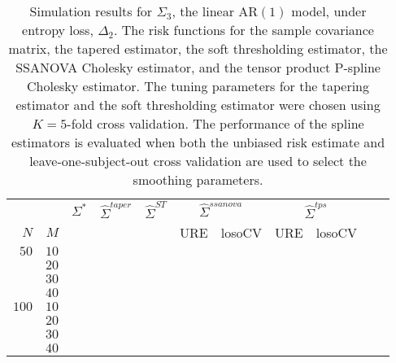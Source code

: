 \documentclass[12pt]{article}
\newcommand{\ra}[1]{\renewcommand{\arraystretch}{#1}}
\theoremstyle{definition}
\begin{document}
\begin{table}\centering
\ra{1.3}
\caption{Simulation results for $\Sigma_3$, the linear $\mbox{AR}\left(1\right)$ model, under entropy loss, $\Delta_2$. The risk functions for the sample covariance matrix, the tapered estimator, the soft thresholding estimator, the SSANOVA Cholesky estimator, and the tensor product P-spline Cholesky estimator. The tuning parameters for the tapering estimator and the soft thresholding estimator were chosen using $K = 5$-fold cross validation. The performance of the spline estimators is evaluated when both the unbiased risk estimate and leave-one-subject-out cross validation are used to select the smoothing parameters.}
\begin{tabular}{@{}rrrcrcrrcrr@{}}\toprule
   &            & \multicolumn{1}{c}{$\Sigma^*$}  & \multicolumn{1}{c}{$\hat{\Sigma}^{taper}$} &\multicolumn{1}{c}{$\hat{\Sigma}^{ST}$} &\multicolumn{2}{c}{ $\hat{\Sigma}^{ssanova}$} &  \multicolumn{2}{c}{ $\hat{\Sigma}^{tps}$}\\
$N$ & $M$ 	&	  &	& & \multicolumn{1}{c}{\mbox{URE}} & \multicolumn{1}{c}{\mbox{losoCV}} &\multicolumn{1}{c}{\mbox{URE}} & \multicolumn{1}{c}{\mbox{losoCV}}\\ \midrule
$50$ & $10$\\
  & $20$  &&&&&&&\\
  & $30$   &&&&&&&\\
& $40$   &&&&&&&\\ 
$100$ & $10$ &&&&&&&\\
& $20$  &&&&&&& \\
& $30$  &&&&&&& \\
& $40$  &&&&&&& \\ 
\bottomrule
\end{tabular}
\end{table}

\end{document}
